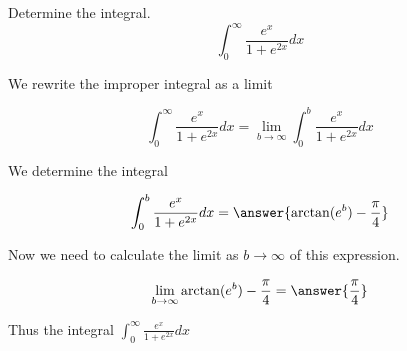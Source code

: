 \documentclass{ximera}
\author{Jason Miller}
\begin{document}
\begin{exercise}
Determine the integral.
\[
\int_{0}^{\infty} \frac{e^{x}}{1+e^{2x}} dx
\]

We  rewrite the improper integral as a limit

\[
\int_{0}^{\infty}\frac{e^{x}}{1+e^{2x}} dx=\lim_{b \to \infty} \int_{0}^{b} \frac{e^{x}}{1+e^{2x}} dx
\]

We determine the integral

\[
\int_{0}^{b} \frac{e^{x}}{1+e^{2x}} dx= \answer{\arctan(e^{b}) - \frac{\pi}{4} }
\]


\begin{exercise}
Now we need to calculate the limit as $b \to \infty$ of this expression. 

\[
\lim_{b \to \infty} \arctan(e^{b})-\frac{\pi}{4} =\answer{ \frac{\pi}{4}}
\]

\begin{exercise}
Thus the integral $\int_{0}^{\infty} \frac{e^{x}}{1+e^{2x}} dx$

\begin{multipleChoice}
\end{multipleChoice}




\end{exercise}
\end{exercise}
\end{exercise}
\end{document}

